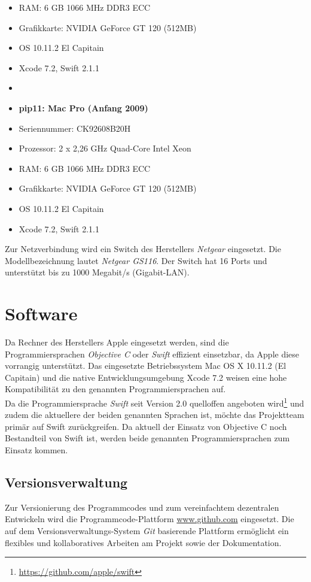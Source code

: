 \begin{itemize}
	\item[] RAM: 6 GB 1066 MHz DDR3 ECC
	\item[] Grafikkarte: NVIDIA GeForce GT 120 (512MB)
	\item[] OS 10.11.2 El Capitain
	\item[] Xcode 7.2, Swift 2.1.1
	\item[] 
	\item\textbf{pip11: Mac Pro (Anfang 2009)}
	\item[] Seriennummer: CK92608B20H
	\item[] Prozessor: 2 x 2,26 GHz Quad-Core Intel Xeon 
	\item[] RAM: 6 GB 1066 MHz DDR3 ECC
	\item[] Grafikkarte: NVIDIA GeForce GT 120 (512MB)
	\item[] OS 10.11.2 El Capitain
	\item[] Xcode 7.2, Swift 2.1.1
\end{itemize}

Zur Netzverbindung wird ein Switch des Herstellers \emph{Netgear} eingesetzt. Die Modellbezeichnung lautet \emph{Netgear GS116}. Der Switch hat 16 Ports und unterstützt bis zu 1000 Megabit/s (Gigabit-LAN).

\section{Software}
\label{softwarebasis}
Da Rechner des Herstellers Apple eingesetzt werden, sind die Programmiersprachen \emph{Objective C} oder \emph{Swift} effizient einsetzbar, da Apple diese vorrangig unterstützt. Das eingesetzte Betriebssystem Mac OS X 10.11.2 (El Capitain) und die native Entwicklungsumgebung Xcode 7.2 weisen eine hohe Kompatibilität zu den genannten Programmiersprachen auf. \\
Da die Programmiersprache \emph{Swift} seit Version 2.0 quelloffen angeboten wird\footnote{\url{https://github.com/apple/swift}} und zudem die aktuellere der beiden genannten Sprachen ist, möchte das Projektteam primär auf Swift zurückgreifen. Da aktuell der Einsatz von Objective C noch Bestandteil von Swift ist, werden beide genannten Programmiersprachen zum Einsatz kommen. \\
\subsection{Versionsverwaltung}
Zur Versionierung des Programmcodes und zum vereinfachtem dezentralen Entwickeln wird die Programmcode-Plattform \url{www.github.com} eingesetzt. Die auf dem Versionsverwaltungs-System \emph{Git} basierende Plattform ermöglicht ein flexibles und kollaboratives Arbeiten am Projekt sowie der Dokumentation. \\
